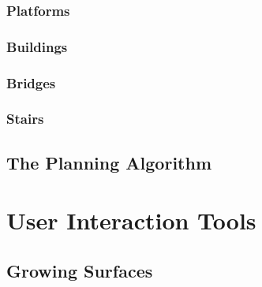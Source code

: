 \documentclass{article}
\begin{document}
\subsubsection{Platforms}
\label{sec:platform}
 

\subsubsection{Buildings}
\label{sec:building}
 

\subsubsection{Bridges}
\label{sec:bridges}
 

\subsubsection{Stairs}
\label{sec:stairs}
 
\subsection{The Planning Algorithm}
\label{sec:PlanningAlgorithm} 
 


\section{User Interaction Tools}
\label{sec:UIT}

\subsection{Growing Surfaces}
\label{sec:GrowingSurfaces}

\end{document}
